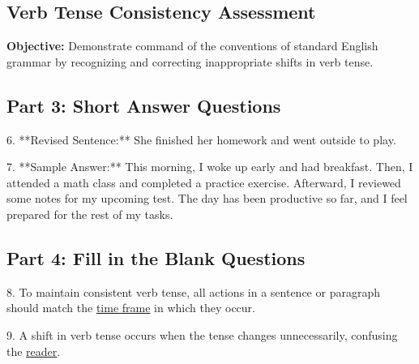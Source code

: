 \documentclass[12pt]{article}
\begin{document}
\subsection*{Verb Tense Consistency Assessment}
\onehalfspacing

\begin{tcolorbox}[colframe=black!40, colback=gray!0, title=Learning Objective]
\textbf{Objective:} Demonstrate command of the conventions of standard English grammar by recognizing and correcting inappropriate shifts in verb tense.
\end{tcolorbox}

\subsection*{Part 3: Short Answer Questions}

6. **Revised Sentence:** She finished her homework and went outside to play.

7. **Sample Answer:** This morning, I woke up early and had breakfast. Then, I attended a math class and completed a practice exercise. Afterward, I reviewed some notes for my upcoming test. The day has been productive so far, and I feel prepared for the rest of my tasks.

\subsection*{Part 4: Fill in the Blank Questions}

8. To maintain consistent verb tense, all actions in a sentence or paragraph should match the \underline{time frame} in which they occur.

9. A shift in verb tense occurs when the tense changes unnecessarily, confusing the \underline{reader}.
\end{document}

